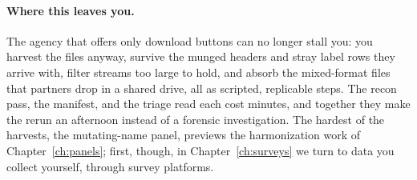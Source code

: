 \paragraph{Where this leaves you.} The agency that offers only download buttons can no longer stall you: you harvest the files anyway, survive the munged headers and stray label rows they arrive with, filter streams too large to hold, and absorb the mixed-format files that partners drop in a shared drive, all as scripted, replicable steps. The recon pass, the manifest, and the triage read each cost minutes, and together they make the rerun an afternoon instead of a forensic investigation. The hardest of the harvests, the mutating-name panel, previews the harmonization work of Chapter~\ref{ch:panels}; first, though, in Chapter~\ref{ch:surveys} we turn to data you collect yourself, through survey platforms.

